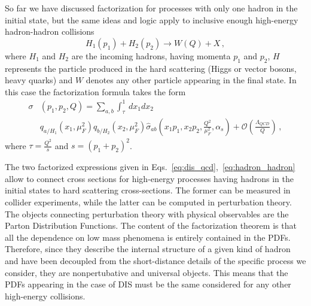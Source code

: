 %
So far we have discussed factorization for processes with only one hadron in the initial state, but
the same ideas and logic apply to inclusive enough high-energy hadron-hadron collisions
$$
H_1\left(p_1\right) + H_2\left(p_2\right) \rightarrow W\left(Q\right) + X\,,
$$
where $H_1$ and $H_2$ are the incoming hadrons, having momenta $p_1$ and $p_2$, $H$ represents
the particle produced in the hard scattering (Higgs or vector bosons, heavy quarks) and $W$
denotes any other particle appearing in the final state. In this case the factorization formula takes the form
\begin{align}
    \label{eq:hadron_hadron}
    \sigma&\left(p_1,p_2,Q\right) = \sum_{a,b}\int_{\tau}^1\, 
    dx_1 dx_2 \, \nonumber \\ 
    &q_{a/H_1}\left(x_1,\mu_F^2\right)q_{b/H_2}\left(x_2,\mu_F^2\right)
    \hat{\sigma}_{ab}\left(x_1p_1,x_2p_2,\frac{Q^2}{\mu_F^2},\alpha_s\right) 
    + \mathcal{O}\left(\frac{\Lambda_{QCD}}{Q}\right)\,,
\end{align}
where $\tau = \frac{Q^2}{s}$ and $s=\left(p_1+p_2\right)^2$.

%
The two factorized expressions given in Eqs.~\eqref{eq:dis_qcd},~\eqref{eq:hadron_hadron}
allow to connect cross sections for high-energy processes having hadrons in the initial states to hard scattering cross-sections.
The former can be measured in collider experiments, while the latter 
can be computed in perturbation theory. The objects connecting perturbation theory with physical observables are
the Parton Distribution Functions.
The content of the factorization theorem is that all the dependence
on low mass phenomena is entirely contained in the PDFs. Therefore, since they describe the internal structure 
of a given kind of hadron and have been decoupled from the short-distance details of
the specific process we consider, they are nonpertubative and universal objects.
This means that the PDFs appearing in the case of DIS must be the same considered for 
any other high-energy collisions.

